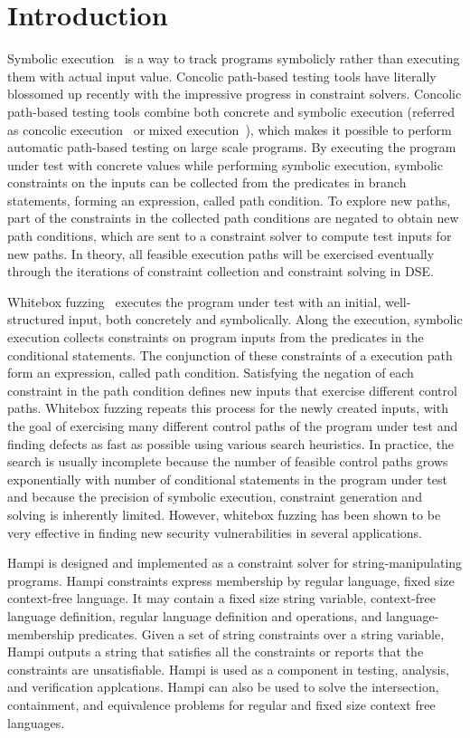 \section{Introduction} 
Symbolic execution~\cite{symbolic} is a way to track programs symbolicly rather than executing them with actual input value. Concolic path-based testing tools have literally blossomed up recently \cite{extenjpf,structural,mixed,exe,fuzzing,pex} with the impressive progress in constraint solvers. Concolic path-based testing tools combine both concrete and symbolic execution (referred as concolic execution~\cite{dart,cute} or mixed execution~\cite{mixed}), which makes it possible to perform automatic path-based testing on large scale programs. By executing the program under test with concrete values while performing symbolic execution, symbolic constraints on the inputs can be collected from the predicates in branch statements, forming an expression, called path condition. To explore new paths, part of the constraints in the collected path conditions are negated to obtain new path conditions, which are sent to a constraint solver to compute test inputs for new paths. In theory, all feasible execution paths will be exercised eventually through the iterations of constraint collection and constraint solving in DSE.

Whitebox fuzzing~\cite{fuzzing} executes the program under test with an initial, well-structured input, both concretely and symbolically. Along the execution, symbolic execution collects constraints on program inputs from the predicates in the conditional statements. The conjunction of these constraints of a execution path form an expression, called path condition. Satisfying the negation of each constraint in the path condition defines new inputs that exercise different control paths. Whitebox fuzzing repeats this process for the newly created inputs, with the goal of exercising many different control paths of the program under test and finding defects as fast as possible using various search heuristics. In practice, the search is usually incomplete because the number of feasible control paths grows exponentially with number of conditional statements in the program under test and because the precision of symbolic execution, constraint generation and solving is inherently limited. However, whitebox fuzzing has been shown to be very effective in finding new security vulnerabilities in several applications.

Hampi \cite{hampi} is designed and implemented as a constraint solver for string-manipulating programs. Hampi constraints express membership by regular language, fixed size context-free language. It may contain a fixed size string variable, context-free language definition, regular language definition and operations, and language-membership predicates. Given a set of string constraints over a string variable, Hampi outputs a string that satisfies all the constraints or reports that the constraints are unsatisfiable. Hampi is used as a component in testing, analysis, and verification applcations. Hampi can also be used to solve the intersection, containment, and equivalence problems for regular and fixed size context free languages.

